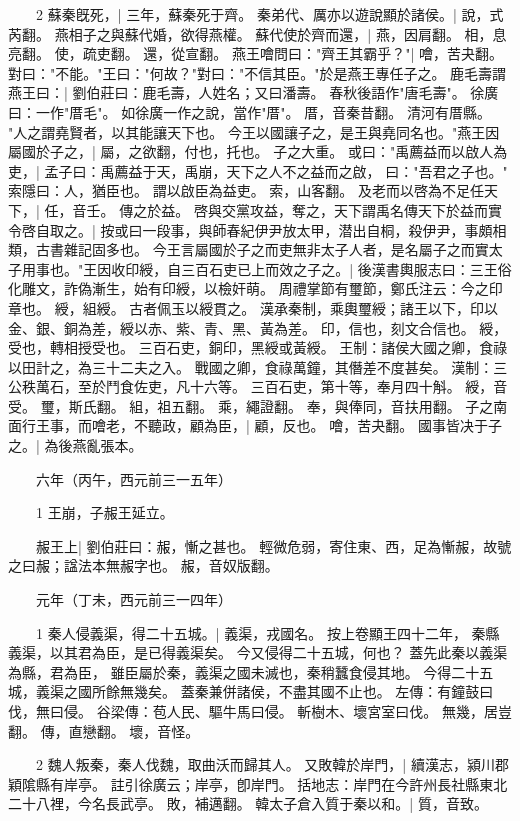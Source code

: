　　2 蘇秦旣死，|{
	三年，蘇秦死于齊。
}
秦弟代、厲亦以遊說顯於諸侯。|{
	說，式芮翻。
}
燕相子之與蘇代婚，欲得燕權。
	蘇代使於齊而還，|{
	燕，因肩翻。
	相，息亮翻。
	使，疏吏翻。
	還，從宣翻。
}
燕王噲問曰："齊王其霸乎？"|{
	噲，苦夬翻。
}
對曰："不能。"王曰："何故？"對曰："不信其臣。"於是燕王專任子之。
	鹿毛壽謂燕王曰：|{
	劉伯莊曰：鹿毛壽，人姓名；又曰潘壽。
	春秋後語作"唐毛壽"。
	徐廣曰：一作"厝毛"。
	如徐廣一作之說，當作"厝"。
	厝，音秦昔翻。
	清河有厝縣。
}
"人之謂堯賢者，以其能讓天下也。
	今王以國讓子之，是王與堯同名也。"燕王因屬國於子之，|{
	屬，之欲翻，付也，托也。
}
子之大重。
	或曰："禹薦益而以啟人為吏，|{
	孟子曰：禹薦益于天，禹崩，天下之人不之益而之啟，
	曰："吾君之子也。"
	索隱曰：人，猶臣也。
	謂以啟臣為益吏。
	索，山客翻。
}
及老而以啓為不足任天下，|{
	任，音壬。
}
傳之於益。
	啓與交黨攻益，奪之，天下謂禹名傳天下於益而實令啓自取之。|{
	按或曰一段事，與師春紀伊尹放太甲，潜出自桐，殺伊尹，事頗相類，古書雜記固多也。
}
今王言屬國於子之而吏無非太子人者，是名屬子之而實太子用事也。"王因收印綬，自三百石吏已上而效之子之。|{
	後漢書輿服志曰：三王俗化雕文，詐偽漸生，始有印綬，以檢奸萌。
	周禮掌節有璽節，鄭氏注云：今之印章也。
	綬，組綬。
	古者佩玉以綬貫之。
	漢承秦制，乘輿璽綬；諸王以下，印以金、銀、銅為差，綬以赤、紫、青、黑、黃為差。
	印，信也，刻文合信也。
	綬，受也，轉相授受也。
	三百石吏，銅印，黑綬或黃綬。
	王制：諸侯大國之卿，食祿以田計之，為三十二夫之入。
	戰國之卿，食祿萬鐘，其僭差不度甚矣。
	漢制：三公秩萬石，至於鬥食佐吏，凡十六等。
	三百石吏，第十等，奉月四十斛。
	綬，音受。
	璽，斯氏翻。
	組，祖五翻。
	乘，繩證翻。
	奉，與俸同，音扶用翻。
}
子之南面行王事，而噲老，不聽政，顧為臣，|{
	顧，反也。
	噲，苦夬翻。
}
國事皆决于子之。|{
	為後燕亂張本。
}

　　六年（丙午，西元前三一五年）

　　1 王崩，子赧王延立。


　　赧王上|{
	劉伯莊曰：赧，慚之甚也。
	輕微危弱，寄住東、西，足為慚赧，故號之曰赧；諡法本無赧字也。
	赧，音奴版翻。
}

　　元年（丁未，西元前三一四年）

　　1 秦人侵義渠，得二十五城。|{
	義渠，戎國名。
	按上卷顯王四十二年，
	秦縣義渠，以其君為臣，是已得義渠矣。
	今又侵得二十五城，何也？
	蓋先此秦以義渠為縣，君為臣，
	雖臣屬於秦，義渠之國未滅也，秦稍蠶食侵其地。
	今得二十五城，義渠之國所餘無幾矣。
	蓋秦兼併諸侯，不盡其國不止也。
	左傳：有鐘鼓曰伐，無曰侵。
	谷梁傳：苞人民、驅牛馬曰侵。
	斬樹木、壞宮室曰伐。
	無幾，居豈翻。
	傳，直戀翻。
	壞，音怪。
}

　　2 魏人叛秦，秦人伐魏，取曲沃而歸其人。
	又敗韓於岸門，|{
	續漢志，潁川郡穎隂縣有岸亭。
	註引徐廣云；岸亭，卽岸門。
	括地志：岸門在今許州長社縣東北二十八裡，今名長武亭。
	敗，補邁翻。
}
韓太子倉入質于秦以和。|{
	質，音致。
}

